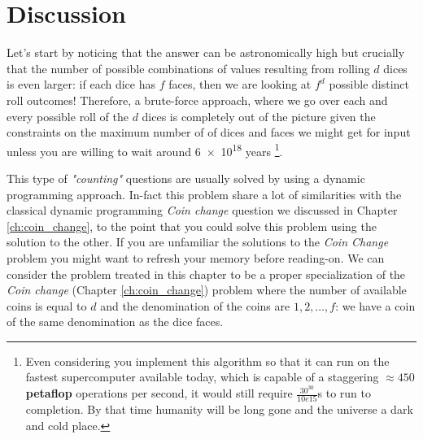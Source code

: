 \section{Discussion}
\label{dice_rolls:sec:discussion}
Let's start by noticing that the answer can be astronomically high but crucially that the number of
possible combinations of values resulting from rolling $d$ dices is even larger: if each dice has
$f$ faces, then we are looking at $f^d$ possible distinct roll outcomes! Therefore, a  brute-force
approach, where we go over each and every possible roll of the $d$ dices is completely out of the
picture given the constraints on the maximum number of of dices and faces we might get for input
unless you are willing to wait around \num{6e18} years \footnote{Even considering you implement this
algorithm so that it can run on the fastest supercomputer available today\cite{top500november2020},
which is capable of a staggering $\approx450$ \textbf{petaflop} operations per second, it would
still require $\frac{30^{30}}{10e15}$\si{\second} to run to completion. By that time humanity will
be long gone and the universe a dark and cold place.}.


This type of \textit{"counting"} questions are usually solved by using a dynamic programming
approach. In-fact this problem share a lot of similarities with the classical dynamic programming
\textit{Coin change} question we discussed in Chapter \ref{ch:coin_change}, to the point that you
could solve this problem using the solution to the other. If you are unfamiliar the solutions to the
\textit{Coin Change} problem you might want to refresh your memory before reading-on. We can
consider the problem treated in this chapter to be a proper specialization of the \textit{Coin
change} (Chapter \ref{ch:coin_change}) problem where the number of available coins is equal to $d$
and the denomination of the coins are $1,2,\ldots,f$: we have a coin of the same denomination as the
dice faces.


